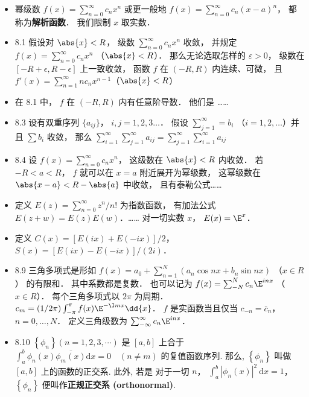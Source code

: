 \begin{itemize}
\item 幂级数 $f(x) = \sum_{n=0}^\infty c_n x^n$ 或更一般地 $f(x) = \sum_{n=0}^\infty c_n (x-a)^n$， 都称为\textbf{解析函数}． 我们限制 $x$ 取实数．

\item 8.1 假设对 $\abs{x}<R$， 级数 $\sum_{n=0}^\infty c_n x^n$ 收敛， 并规定 $f(x) = \sum_{n=0}^\infty c_n x^n$ （$\abs{x}<R$）． 那么无论选取怎样的 $\varepsilon >0$， 级数在 $[-R+\epsilon, R-\epsilon]$ 上一致收敛， 函数 $f$ 在 $(-R,R)$ 内连续、可微， 且 $f'(x)=\sum_{n=1}^\infty nc_n x^{n-1}$（$\abs{x}<R$）

\item 在 8.1 中， $f$ 在 $(-R,R)$ 内有任意阶导数． 他们是 ……

\item 8.3 设有双重序列 $\{a_{ij}\}$， $i,j=1,2,3\dots$． 假设 $\sum_{j=1}^\infty = b_i$ （$i=1,2,\dots$）并且 $\sum b_i$ 收敛， 那么 $\sum_{i=1}^\infty\sum_{j=1}^\infty a_{ij} = \sum_{j=1}^\infty\sum_{i=1}^\infty a_{ij}$

\item 8.4 设 $f(x)=\sum_{n=0}^\infty c_nx^n$， 这级数在 $\abs{x}<R$ 内收敛． 若 $-R<a<R$， $f$ 就可以在 $x=a$ 附近展开为幂级数， 这幂级数在 $\abs{x-a}<R-\abs{a}$ 中收敛， 且有泰勒公式……

\item 定义 $E(z) = \sum_{n=0}^\infty z^n/n!$ 为指数函数， 有加法公式 $E(z+w)=E(z)E(w)$．……  对一切实数 $x$， $E(x)=\E^x$．

\item 定义 $C(x) = [E(ix)+E(-ix)]/2$， $S(x)=[E(ix)-E(-ix)]/(2i)$．

\item 8.9 三角多项式是形如 $f(x) = a_0 + \sum_{n=1}^N (a_n\cos nx + b_n \sin nx)$ （$x\in R$） 的有限和． 其中系数都是复数． 也可以记为 $f(x) = \sum_{-N}^N c_n \E^{inx}$ （$x\in R$）． 每个三角多项式以 $2\pi$ 为周期． $c_m = (1/2\pi) \int_{-\pi}^{\pi} f(x)\E^{-\I mx}\dd{x}$． $f$ 是实函数当且仅当 $c_{-n} = \bar c_n$， $n=0,\dots,N$． 定义三角级数为 $\sum_{-\infty}^\infty c_n \E^{inx}$．

\item 8.10 $\left\{\phi_{n}\right\}(n=1,2,3, \cdots)$ 是 $[a, b]$ 上合于 $\int_{a}^{b} \phi_{n}(x) \overline{\phi_{m}(x)} \mathrm{d} x=0 \quad(n \neq m)$ 的复值函数序列. 那么, $\left\{\phi_{n}\right\}$ 叫做 $[a, b]$ 上的函数的正交系. 此外, 若是 对于一切 $n$， $\int_{a}^{b}\left|\phi_{n}(x)\right|^{2} \mathrm{~d} x=1$， $\left\{\phi_{n}\right\}$ 便叫作\textbf{正规正交系 (orthonormal)}.


\end{itemize}
